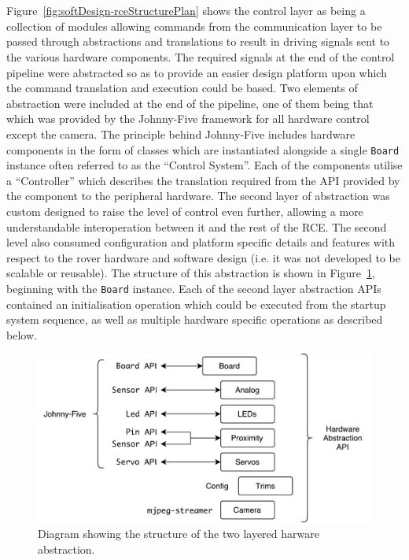         \\\\
          Figure~\ref{fig:softDesign-rceStructurePlan} shows the control layer as being a collection of modules allowing commands from the communication layer to be passed through abstractions and translations to result in driving signals sent to the various hardware components. The required signals at the end of the control pipeline were abstracted so as to provide an easier design platform upon which the command translation and execution could be based. Two elements of abstraction were included at the end of the pipeline, one of them being that which was provided by the Johnny-Five framework for all hardware control except the camera. The principle behind Johnny-Five includes hardware components in the form of classes which are instantiated alongside a single \texttt{Board} instance often referred to as the ``Control System''. Each of the components utilise a ``Controller'' which describes the translation required from the API provided by the component to the peripheral hardware. The second layer of abstraction was custom designed to raise the level of control even further, allowing a more understandable interoperation between it and the rest of the RCE. The second level also consumed configuration and platform specific details and features with respect to the rover hardware and software design (i.e. it was not developed to be scalable or reusable). The structure of this abstraction is shown in Figure~\ref{fig:softDesign-hardwareAbstractionStructure}, beginning with the \texttt{Board} instance. Each of the second layer abstraction APIs contained an initialisation operation which could be executed from the startup system sequence, as well as multiple hardware specific operations as described below.
          
          \begin{figure}[h!]
            \centering
            \includegraphics[width=0.7\linewidth]{figures/softDesign-hardwareAbstractionStructure}
            \caption[Diagram showing the structure of the two layered harware abstraction.]{Diagram showing the structure of the two layered harware abstraction.}
            \label{fig:softDesign-hardwareAbstractionStructure}
          \end{figure}
          
